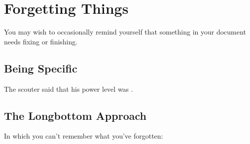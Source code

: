 \section{Forgetting Things}

You may wish to occasionally remind yourself that something in your document needs fixing or finishing.

\subsection{Being Specific}

The scouter said that his power level was \get[what?].

\subsection{The Longbottom Approach}

In which you can't remember what you've forgotten:

\get
